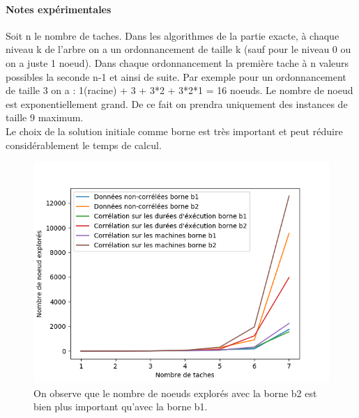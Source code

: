 \documentclass[a4paper, 10pt]{article}
\begin{document}
		\paragraph{Notes expérimentales}{
                  Soit n le nombre de taches.
                  Dans les algorithmes de la partie exacte, à chaque niveau k de l'arbre on a un ordonnancement de taille k (sauf pour le niveau 0 ou on a juste 1 noeud). Dans chaque ordonnancement la première tache à n valeurs possibles la seconde n-1 et ainsi de suite. Par exemple pour un ordonnancement de taille 3 on a : 1(racine) + 3 + 3*2 + 3*2*1 = 16 noeuds. Le nombre de noeud est exponentiellement grand. De ce fait on prendra uniquement des instances de taille 9 maximum. \\
                  Le choix de la solution initiale comme borne est très important et peut réduire considérablement le temps de calcul.
                }
                
                \begin{figure}[h]
			\centering
			\includegraphics[width=0.85\linewidth]{graphes/b2.png}
			\caption{On observe que le nombre de noeuds explorés avec la borne b2 est bien plus important qu'avec la borne b1.}
			\label{fig:b2}
		\end{figure}
		
\end{document}
